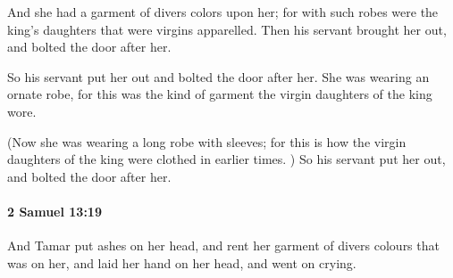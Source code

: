 			\begin{versebox}
					\item[BHS] 
					\item[ASV] And she had a garment of divers colors upon her; for with such robes were the king's daughters that were virgins apparelled. Then his servant brought her out, and bolted the door after her.
					\item[NIV] So his servant put her out and bolted the door after her. She was wearing an ornate robe, for this was the kind of garment the virgin daughters of the king wore.
					\item[NRSV] (Now she was wearing a long robe with sleeves; for this is how the virgin daughters of the king were clothed in earlier times. ) So his servant put her out, and bolted the door after her.
			\end{versebox}

		\paragraph{2 Samuel 13:19} %
			\label{2SAMUEL-13-19}

			And Tamar put ashes on her head, and rent her garment of divers colours that was on her, and laid her hand on her head, and went on crying.

